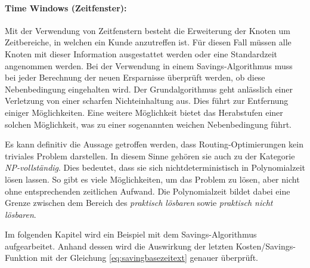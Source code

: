 \paragraph{Time Windows (Zeitfenster):} 

Mit der Verwendung von Zeitfenstern besteht die Erweiterung der Knoten um Zeitbereiche, in welchen ein Kunde anzutreffen ist. 
Für diesen Fall müssen alle Knoten mit dieser Information ausgestattet werden oder eine Standardzeit angenommen werden. 
Bei der Verwendung in einem Savings-Algorithmus muss bei jeder Berechnung der neuen Ersparnisse überprüft werden, ob diese Nebenbedingung eingehalten wird. 
Der Grundalgorithmus geht anlässlich einer Verletzung von einer scharfen Nichteinhaltung aus. 
Dies führt zur Entfernung einiger Möglichkeiten. 
Eine weitere Möglichkeit bietet das Herabstufen einer solchen Möglichkeit, was zu einer sogenannten weichen Nebenbedingung führt. 

\noindent
Es kann definitiv die Aussage getroffen werden, dass Routing-Optimierungen kein triviales Problem darstellen. 
In diesem Sinne gehören sie auch zu der Kategorie \textit{NP-vollständig}. 
Dies bedeutet, dass sie sich nichtdeterministisch in Polynomialzeit lösen lassen. 
So gibt es viele Möglichkeiten, um das Problem zu lösen, aber nicht ohne entsprechenden zeitlichen Aufwand. 
Die Polynomialzeit bildet dabei eine Grenze zwischen dem Bereich des \textit{praktisch lösbaren} sowie \textit{praktisch nicht lösbaren}. \newline

\noindent
Im folgenden Kapitel wird ein Beispiel mit dem Savings-Algorithmus aufgearbeitet. 
Anhand dessen wird die Auswirkung der letzten Kosten/Savings-Funktion mit der Gleichung \ref{eq:savingbasezeitext} genauer überprüft. 